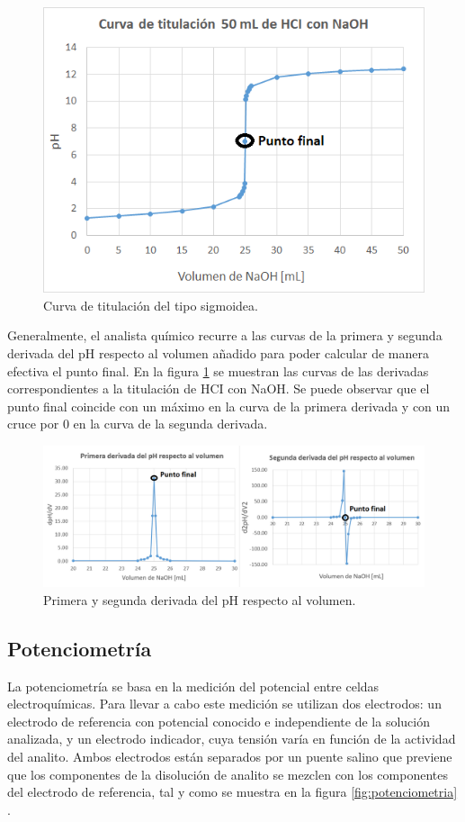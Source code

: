 \begin{figure}[htbp]
	\centering
	\includegraphics[width=.7\textwidth]{./Figures/curvaTitulacion1.png}
	\caption{Curva de titulación del tipo sigmoidea.}
	\label{fig:sigmoidea}
\end{figure}

Generalmente, el analista químico recurre a las curvas de la primera y segunda derivada del pH respecto al volumen añadido para poder calcular de manera efectiva el punto final. En la figura \ref{fig:sigmoidea} se muestran las curvas de las derivadas correspondientes a la titulación de HCI con NaOH. Se puede observar que el punto final coincide con un máximo en la curva de la primera derivada y con un cruce por 0 en la curva de la segunda derivada.

\begin{figure}[htbp]
	\centering
	\includegraphics[width=1.0\textwidth]{./Figures/derivada.png}
	\caption{Primera y segunda derivada del pH respecto al volumen.}
	\label{fig:derivada}
\end{figure}

\subsection{Potenciometría}

La potenciometría se basa en la medición del potencial entre celdas electroquímicas. Para llevar a cabo este medición se utilizan dos electrodos: un electrodo de referencia con potencial conocido e independiente de la solución analizada, y un electrodo indicador, cuya tensión varía en función de la actividad del analito. Ambos electrodos están separados por un puente salino que previene que los componentes de la disolución de analito se mezclen con los componentes del electrodo de referencia, tal y como se muestra en la figura \ref{fig:potenciometria} \citep{BOOK:1}.

